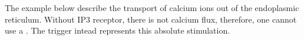 \begin{center}
\end{center}

The example below describe the transport of calcium ions out of the endoplasmic reticulum. Without IP3 receptor, there is not calcium flux, therefore, one cannot use a . The trigger intead represents this absolute stimulation.

\begin{center}
\end{center}

\normalcolor

